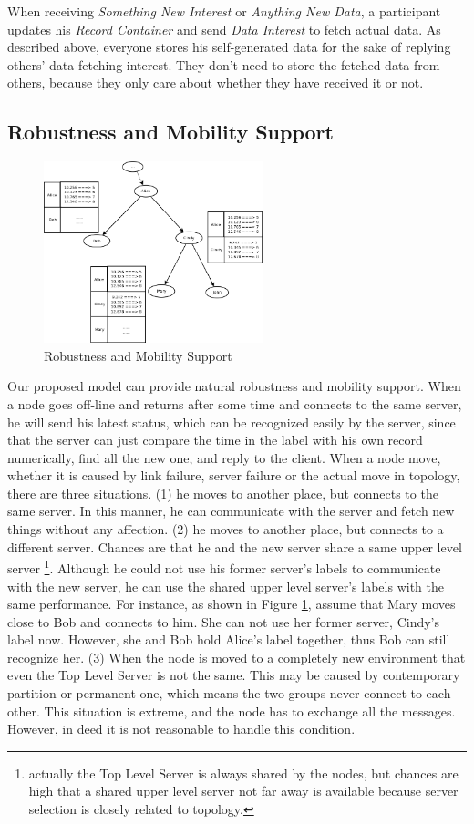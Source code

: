 \documentclass[conference]{IEEEtran}
\begin{document}
When receiving \emph{Something New Interest} or \emph{Anything New Data}, a participant updates his \emph{Record Container} and send \emph{Data Interest} to fetch actual data. As described above, everyone stores his self-generated data for the sake of replying others' data fetching interest. They don't need to store the fetched data from others, because they only care about whether they have received it or not.


\subsection{Robustness and Mobility Support}
\label{mobility}
\begin{figure}[!t]
\centering
\includegraphics[width=2.5in]{../png/mobility.png}
\caption{Robustness and Mobility Support}
\label{mobility_pic}
\end{figure}
Our proposed model can provide natural robustness and mobility support. When a node goes off-line and returns after some time and connects to the same server, he will send his latest status, which can be recognized easily by the server, since that the server can just compare the time in the label with his own record numerically, find all the new one, and reply to the client. When a node move, whether it is caused by link failure, server failure or the actual move in topology, there are three situations.
(1) he moves to another place, but connects to the same server. In this manner, he can communicate with the server and fetch new things without any affection.
(2) he moves to another place, but connects to a different server. Chances are that he and the new server share a same upper level server \footnote{actually the Top Level Server is always shared by the nodes, but chances are high that a shared upper level server not far away is available because server selection is closely related to topology.}. Although he could not use his former server's labels to communicate with the new server, he can use the shared upper level server's labels with the same performance.
For instance, as shown in Figure \ref{mobility_pic}, assume that Mary moves close to Bob and connects to him. She can not use her former server, Cindy's label now. However, she and Bob hold Alice's label together, thus Bob can still recognize her.
(3) When the node is moved to a completely new environment that even the Top Level Server is not the same. This may be caused by contemporary partition or permanent one, which means the two groups never connect to each other. This situation is extreme, and the node has to exchange all the messages. However, in deed it is not reasonable to handle this condition.
\end{document}
